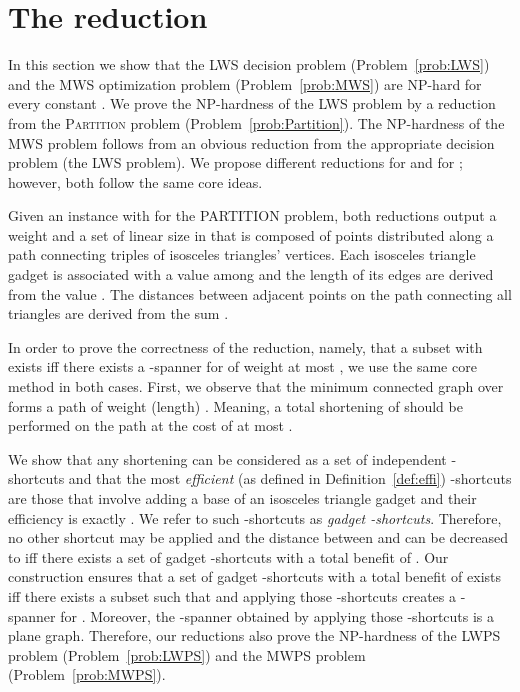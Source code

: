 \documentclass[a4paper]{llncs}
\begin{document}
\section{The reduction}\label{sec:red}

In this section we show that the LWS decision problem (Problem~\ref{prob:LWS})
and the MWS optimization problem (Problem~\ref{prob:MWS}) 
are NP-hard for every constant .
We prove the NP-hardness of the LWS problem by a reduction 
from the \textsc{Partition} problem (Problem~\ref{prob:Partition}).
The NP-hardness of the MWS problem 
follows from an obvious reduction from the appropriate 
decision problem (the LWS problem).
We propose different reductions for  and for ;
however, both follow the same core ideas.

Given an instance  with  for the PARTITION problem,
both reductions output a weight  and a set  of linear size in  
that is composed of points distributed along a path 
connecting  triples of isosceles triangles' vertices.
Each isosceles triangle gadget is associated with a value  among 
and the length of its edges are derived from the value . 
The distances between adjacent points on the path connecting all triangles
are derived from the sum .

In order to prove the correctness of the reduction, namely, 
that a subset  with  exists 
iff there exists a -spanner for  of weight at most , 
we use the same core method in both cases.
First, we observe that the minimum connected graph over  forms a path
 of weight (length) . 
Meaning, a total shortening of  should be performed on the path
at the cost of at most .

We show that any shortening can be considered as a set of independent -shortcuts
and that the most \emph{efficient} (as defined in Definition~\ref{def:effi}) 
-shortcuts are those that involve adding a base of
an isosceles triangle gadget and their efficiency is exactly .
We refer to such -shortcuts as \emph{gadget -shortcuts}.
Therefore, no other shortcut may be applied and 
the distance between  and  can be decreased to  iff there  
exists a set of gadget -shortcuts with a total benefit of .
Our construction ensures that a set of gadget -shortcuts 
with a total benefit of  exists iff
there exists a subset  such that 
and applying those -shortcuts creates a -spanner for .
Moreover, the -spanner obtained by applying those -shortcuts is a plane graph.
Therefore, our reductions also prove the NP-hardness of the LWPS problem (Problem~\ref{prob:LWPS})
and the MWPS problem (Problem~\ref{prob:MWPS}).
\end{document}
